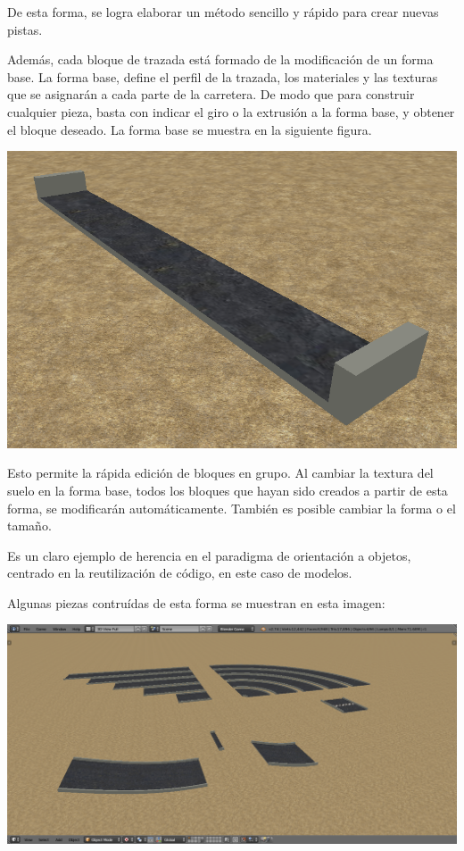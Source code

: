 \documentclass[11pt,a4paper,hidelinks]{article}
\begin{document}
De esta forma, se logra elaborar un método sencillo y rápido para crear nuevas 
pistas.

Además, cada bloque de trazada está formado de la modificación de un forma base.  
La forma base, define el perfil de la trazada, los materiales y las texturas que 
se asignarán a cada parte de la carretera. De modo que para construir cualquier 
pieza, basta con indicar el giro o la extrusión a la forma base, y obtener el 
bloque deseado. La forma base se muestra en la siguiente figura.

\includegraphics[width=\textwidth]{base}

Esto permite la rápida edición de bloques en grupo. Al cambiar la textura del 
suelo en la forma base, todos los bloques que hayan sido creados a partir de 
esta forma, se modificarán automáticamente. También es posible cambiar la forma 
o el tamaño.

Es un claro ejemplo de herencia en el paradigma de orientación a objetos, 
centrado en la reutilización de código, en este caso de modelos.

Algunas piezas contruídas de esta forma se muestran en esta imagen:

\includegraphics[width=\textwidth]{piezas}
\end{document}
